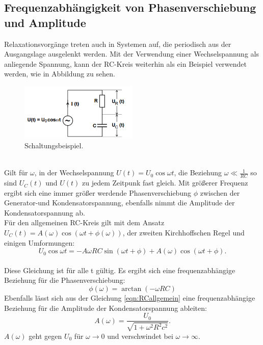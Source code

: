 \subsection{Frequenzabhängigkeit von Phasenverschiebung und Amplitude}
Relaxationsvorgänge treten auch in Systemen auf, die periodisch aus der Ausgangslage ausgelenkt werden.
Mit der Verwendung einer Wechselspannung als anliegende Spannung, kann der RC-Kreis weiterhin als ein Beispiel verwendet werden, wie in Abbildung zu sehen.\\ %
\begin{figure}
  \centering
  \includegraphics[width=0.5\textwidth]{schaltbild2.PNG}
  \caption{Schaltungsbeispiel.\cite{skript}}
  \label{fig:schaltung2}
\end{figure}\\
Gilt für $\omega$, in der Wechselspannung $U(t)=U_0\cos\omega t$, die Beziehung $\omega\ll\frac{1}{RC}$
so sind $U_C(t)$ und $U(t)$ zu jedem Zeitpunk fast gleich.
Mit größerer Frequenz ergibt sich eine immer größer werdende Phasenverschiebung $\phi$ zwischen der Generator-und Kondensatorspannung,
ebenfalls nimmt die Amplitude der Kondensatorspannung ab.\\
Für den allgemeinen RC-Kreis gilt mit dem Ansatz $U_C(t)=A(\omega)\cos(\omega t+\phi(\omega))$,
der zweiten Kirchhoffschen Regel und einigen Umformungen:
\begin{equation}
  U_0\cos\omega t =-A\omega RC\sin(\omega t+\phi)+A(\omega)\cos(\omega t+\phi).\label{eqn:RCallgemein}
\end{equation}\\
Diese Gleichung ist für alle t gültig.
Es ergibt sich eine frequenzabhängige Beziehung für die Phasenverschiebung:
\begin{equation}
  \phi(\omega)=\arctan(-\omega RC)
\end{equation}
Ebenfalls lässt sich aus der Gleichung \eqref{eqn:RCallgemein} eine frequenzabhängige Beziehung für die Amplitude der Kondensatorspannung ableiten:
\begin{equation}
  A(\omega)=\frac{U_0}{\sqrt{1+\omega^{2}R^2c^2}}.\label{eqn:amplitude}
\end{equation}
$A(\omega)$ geht gegen $U_0$ für $\omega\longrightarrow 0$ und verschwindet bei $\omega\longrightarrow\infty$.
